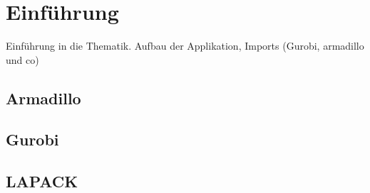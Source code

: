 \section{Einführung}
Einführung in die Thematik. Aufbau der Applikation, Imports (Gurobi, armadillo und co)

\subsection{Armadillo}
\subsection{Gurobi}
\subsection{LAPACK}